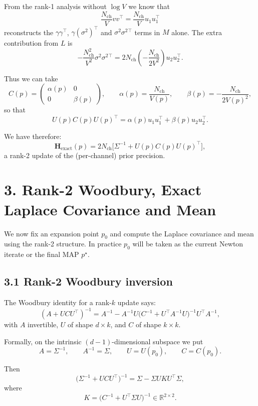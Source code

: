 \documentclass[11pt]{article}
\begin{document}
From the rank-1 analysis without $\log V$ we know that
\[
  \frac{N_{\text{ch}}}{V}v v^\top
  = \frac{N_{\text{ch}}}{V}u_1 u_1^\top
\]
reconstructs the $\gamma\gamma^\top$, $\gamma(\sigma^2)^\top$ and
$\sigma^2\sigma^2{}^\top$ terms in $M$ alone.  The extra contribution
from $L$ is
\[
  -\frac{N_{\text{ch}}^2}{V^2}\sigma^2\sigma^2{}^\top
  = 2N_{\text{ch}}
    \left(-\frac{N_{\text{ch}}}{2V^2}\right) u_2 u_2^\top.
\]

Thus we can take
\[
  C(p) =
  \begin{pmatrix}
    \alpha(p) & 0\\[3pt]
    0         & \beta(p)
  \end{pmatrix},
  \qquad
  \alpha(p) = \frac{N_{\text{ch}}}{V(p)},
  \qquad
  \beta(p)  = -\frac{N_{\text{ch}}}{2V(p)^2},
\]
so that
\[
  U(p)C(p)U(p)^\top
  = \alpha(p)u_1 u_1^\top + \beta(p)u_2 u_2^\top.
\]

We have therefore:
\[
  \boxed{
  \mathbf{H}_{\text{exact}}(p)
  =
  2N_{\text{ch}}
  \bigl[\Sigma^{-1} + U(p)C(p)U(p)^\top\bigr],
  }
\]
a rank-2 update of the (per-channel) prior precision.

\section*{3. Rank-2 Woodbury, Exact Laplace Covariance and Mean}

We now fix an expansion point $p_0$ and compute the Laplace covariance
and mean using the rank-2 structure.  In practice $p_0$ will be taken
as the current Newton iterate or the final MAP $p^\star$.

\subsection*{3.1 Rank-2 Woodbury inversion}

The Woodbury identity for a rank-$k$ update says:
\[
  (A + U C U^\top)^{-1}
  =
  A^{-1}
  - A^{-1}U\bigl(C^{-1} + U^\top A^{-1}U\bigr)^{-1}U^\top A^{-1},
\]
with $A$ invertible, $U$ of shape $d\times k$, and $C$ of shape
$k\times k$.

Formally, on the intrinsic $(d-1)$-dimensional subspace we put
\[
  A = \Sigma^{-1},
  \qquad
  A^{-1} = \Sigma,
  \qquad
  U = U(p_0),
  \qquad
  C = C(p_0).
\]

Then
\[
  \bigl(\Sigma^{-1} + U C U^\top\bigr)^{-1}
  =
  \Sigma
  - \Sigma U K U^\top \Sigma,
\]
where
\[
  K
  =
  \bigl(C^{-1} + U^\top\Sigma U\bigr)^{-1}
  \in \mathbb{R}^{2\times 2}.
\]
\end{document}
